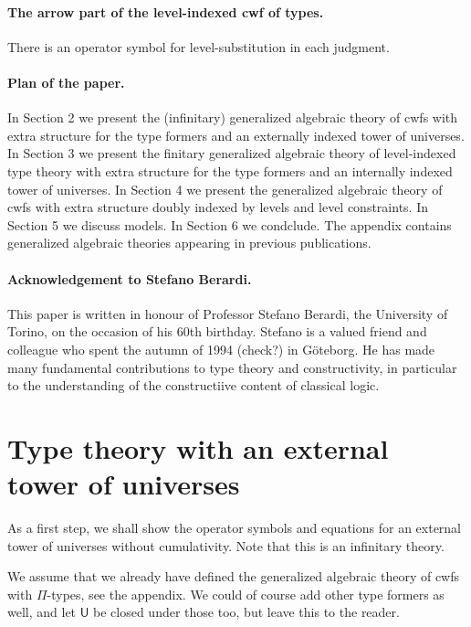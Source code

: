\documentclass[11pt,a4paper]{article}
\theoremstyle{definition}
\newcommand{\UU}{\mathsf{U}}
\def\UU{\mathsf{U}}
\begin{document}
\paragraph{The arrow part of the level-indexed cwf of types.} There is an operator symbol for level-substitution in each judgment.

\paragraph{Plan of the paper.} In Section 2 we present the (infinitary) generalized algebraic theory of cwfs with extra structure for the type formers and an externally indexed tower of universes. In Section 3 we present the finitary generalized algebraic theory of level-indexed type theory with extra structure for the type formers and an internally indexed tower of universes. In Section 4 we present the generalized algebraic theory of cwfs with extra structure doubly indexed by levels and level constraints. In Section 5 we discuss models. In Section 6 we condclude. The appendix contains generalized algebraic theories appearing in previous publications. 

\paragraph{Acknowledgement to Stefano Berardi.} This paper is written in honour of Professor Stefano Berardi, the University of Torino, on the occasion of his 60th birthday. Stefano is a valued friend and colleague who spent the autumn of 1994 (check?) in Göteborg. He has made many fundamental contributions to type theory and constructivity, in particular to the understanding of the constructiive content of classical logic.

\section{Type theory with an external tower of universes}

As a first step, we shall show the operator symbols and equations for an external tower of universes without cumulativity. Note that this is an infinitary theory.

We assume that we already have defined the generalized algebraic theory of cwfs with $\Pi$-types, see the appendix. We could of course add other type formers as well, and let $\UU$ be closed under those too, but leave this to the reader. 
\end{document}
